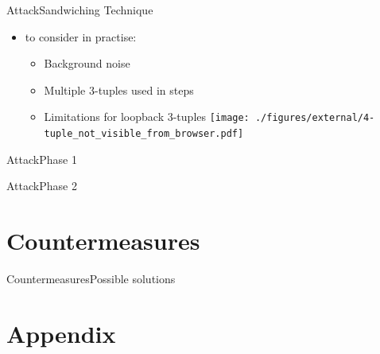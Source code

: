 \documentclass[aspectratio=169, hyperref={colorlinks=true, allcolors=SecondaryColor}, c]{beamer}
\begin{document}
\begin{frame}[fragile]{Attack}{Sandwiching Technique}
	\begin{itemize}
		\item to consider in practise:
		\begin{itemize}
			\item \alert{Background noise}
			\item \alert{Multiple 3-tuples used in steps}
			\item \alert{Limitations for loopback 3-tuples}
          \texttt{[image: ./figures/external/4-tuple\_not\_visible\_from\_browser.pdf]} %
		\end{itemize}
	\end{itemize}
\end{frame}

\ifattackphaseone
	\begin{frame}[fragile]{Attack}{Phase 1}
		\begin{center}
			\begin{adjustbox}{scale=0.7}
				
			\end{adjustbox}
		\end{center}
	\end{frame}
\else
\fi

\ifattackphaseone
	\begin{frame}[fragile]{Attack}{Phase 2}
		\begin{center}
			\begin{adjustbox}{scale=0.7}
				
			\end{adjustbox}
		\end{center}
	\end{frame}
\else
\fi

\ifcountermeasures
	\section{Countermeasures}

	\begin{frame}[fragile]{Countermeasures}{Possible solutions}
	\end{frame}
\else
\fi

\ifappendix
	\section{Appendix}
\end{document}
